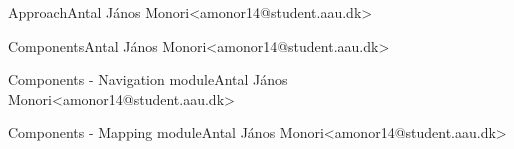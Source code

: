 \begin{frame}{Approach}{Antal János Monori\newline<amonor14@student.aau.dk>}

\end{frame}

\begin{frame}{Components}{Antal János Monori\newline<amonor14@student.aau.dk>}
	
\end{frame}

\begin{frame}{Components - Navigation module}{Antal János Monori\newline<amonor14@student.aau.dk>}
	
\end{frame}

\begin{frame}{Components - Mapping module}{Antal János Monori\newline<amonor14@student.aau.dk>}
	
\end{frame}